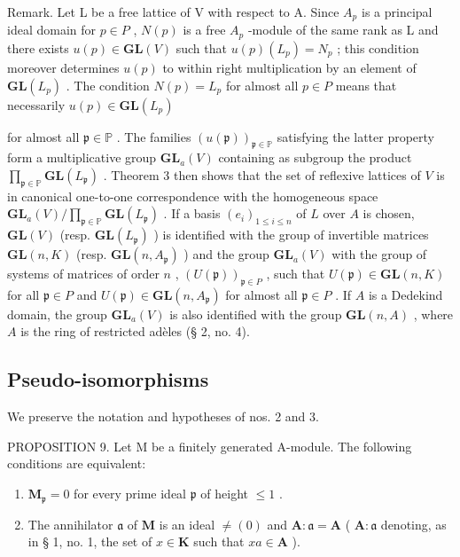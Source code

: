 Remark. Let L be a free lattice of V with respect to A. Since \(A_{p}\) is a principal ideal domain for \(p \in P\) , \(N(p)\) is a free \(A_{p}\) -module of the same rank as L and there exists \(u(p) \in \mathbf{GL}(V)\) such that \(u(p)(L_{p}) = N_{p}\) ; this condition moreover determines \(u(p)\) to within right multiplication by an element of \(\mathbf{GL}(L_{p})\) . The condition \(N(p) = L_{p}\) for almost all \(p \in P\) means that necessarily \(u(p) \in \mathbf{GL}(L_{p})\)

for almost all \(\mathfrak{p} \in \mathbb{P}\) . The families \((u(\mathfrak{p}))_{\mathfrak{p} \in \mathbb{P}}\) satisfying the latter property form a multiplicative group \(\mathbf{GL}_a(V)\) containing as subgroup the product \(\prod_{\mathfrak{p} \in \mathbb{P}} \mathbf{GL}(L_{\mathfrak{p}})\) . Theorem 3 then shows that the set of reflexive lattices of \(V\) is in canonical one-to-one correspondence with the homogeneous space \(\mathbf{GL}_a(V)/\prod_{\mathfrak{p} \in \mathbb{P}} \mathbf{GL}(L_{\mathfrak{p}})\) . If a basis \((e_i)_{1 \leq i \leq n}\) of \(L\) over \(A\) is chosen, \(\mathbf{GL}(V)\) (resp. \(\mathbf{GL}(L_{\mathfrak{p}})\) ) is identified with the group of invertible matrices \(\mathbf{GL}(n, K)\) (resp. \(\mathbf{GL}(n, A_{\mathfrak{p}})\) ) and the group \(\mathbf{GL}_a(V)\) with the group of systems of matrices of order \(n\) , \((U(\mathfrak{p}))_{\mathfrak{p} \in P}\) , such that \(U(\mathfrak{p}) \in \mathbf{GL}(n, K)\) for all \(\mathfrak{p} \in P\) and \(U(\mathfrak{p}) \in \mathbf{GL}(n, A_{\mathfrak{p}})\) for almost all \(\mathfrak{p} \in P\) . If \(A\) is a Dedekind domain, the group \(\mathbf{GL}_a(V)\) is also identified with the group \(\mathbf{GL}(n, A)\) , where \(A\) is the ring of restricted adèles (§ 2, no. 4).

\subsection{Pseudo-isomorphisms}

We preserve the notation and hypotheses of nos. 2 and 3.

PROPOSITION 9. Let M be a finitely generated A-module. The following conditions are equivalent:

\begin{enumerate}
\def\labelenumi{(\alph{enumi})}
\item
  \(\mathbf{M}_{\mathfrak{p}} = 0\) for every prime ideal \(\mathfrak{p}\) of height \(\leqslant 1\) .
\item
  The annihilator \(\mathfrak{a}\) of \(\mathbf{M}\) is an ideal \(\neq (0)\) and \(\mathbf{A}:\mathfrak{a} = \mathbf{A}\) ( \(\mathbf{A}:\mathfrak{a}\) denoting, as in § 1, no. 1, the set of \(x\in \mathbf{K}\) such that \(xa\in \mathbf{A}\) ).
\end{enumerate}

